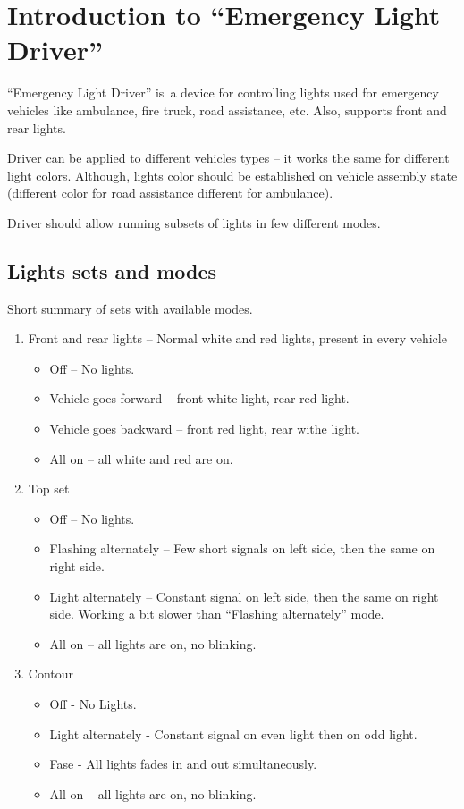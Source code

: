 \section{Introduction to ``Emergency Light Driver''}
``Emergency Light Driver'' is~a device for controlling lights used for emergency vehicles like
ambulance, fire truck, road assistance, etc. Also, supports front and rear lights.

Driver can be applied to different vehicles types -- it works the same for different light colors. Although, lights color should be established on vehicle assembly state (different color for road assistance
different for ambulance).

Driver should allow running subsets of lights in few different modes.


\subsection{Lights sets and modes}
Short summary of sets with available modes.

\begin{enumerate}
	\item Front and rear lights -- Normal white and red lights, present in every vehicle
	\begin{itemize}
		\item Off -- No lights.
		\item Vehicle goes forward -- front white light, rear red light.
		\item Vehicle goes backward -- front red light, rear withe light.
		\item All on -- all white and red are on.
	\end{itemize}
	
	\item Top set
	\begin{itemize}
		\item Off -- No lights.
		\item Flashing alternately -- Few short signals on left side, then the same on right side.
		\item Light alternately -- Constant signal on left side, then the same on right side. Working a bit slower than ``Flashing alternately'' mode.
		\item All on -- all lights are on, no blinking.
	\end{itemize}
		
	\item Contour
	\begin{itemize}
		\item Off - No Lights.
		\item Light alternately - Constant signal on even light then on odd light.
		\item Fase - All lights fades in and out simultaneously.
		\item All on -- all lights are on, no blinking.
	\end{itemize}
\end{enumerate}

